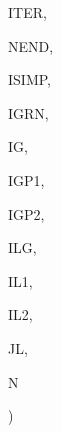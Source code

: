 {\begin{DoxyParamCaption}
\item[{integer, dimension  (ilg)}]{I\+T\+E\+R, }
\item[{integer, dimension  (ilg)}]{N\+E\+N\+D, }
\item[{integer, dimension (ilg)}]{I\+S\+I\+M\+P, }
\item[{integer, dimension  (ilg)}]{I\+G\+R\+N, }
\item[{integer}]{I\+G, }
\item[{integer}]{I\+G\+P1, }
\item[{integer}]{I\+G\+P2, }
\item[{integer}]{I\+L\+G, }
\item[{integer}]{I\+L1, }
\item[{integer}]{I\+L2, }
\item[{integer}]{J\+L, }
\item[{integer}]{N}
\end{DoxyParamCaption}
)}\label{WFLOW_8f_a7a3409d93e2e44adae8e38e9ddd99f97}


